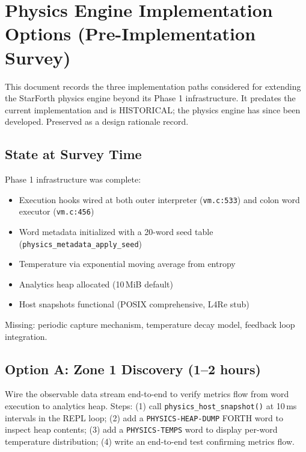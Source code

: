 
\section{Physics Engine Implementation Options (Pre-Implementation Survey)}

This document records the three implementation paths considered for
extending the StarForth physics engine beyond its Phase 1 infrastructure.
It predates the current implementation and is HISTORICAL; the physics engine
has since been developed. Preserved as a design rationale record.

\subsection{State at Survey Time}

Phase 1 infrastructure was complete:

\begin{itemize}
  \item Execution hooks wired at both outer interpreter
        (\texttt{vm.c:533}) and colon word executor (\texttt{vm.c:456})
  \item Word metadata initialized with a 20-word seed table
        (\texttt{physics\_metadata\_apply\_seed})
  \item Temperature via exponential moving average from entropy
  \item Analytics heap allocated (10\,MiB default)
  \item Host snapshots functional (POSIX comprehensive, L4Re stub)
\end{itemize}

Missing: periodic capture mechanism, temperature decay model, feedback loop
integration.

\subsection{Option A: Zone 1 Discovery (1--2 hours)}

Wire the observable data stream end-to-end to verify metrics flow from word
execution to analytics heap. Steps: (1) call \texttt{physics\_host\_snapshot()}
at 10\,ms intervals in the REPL loop; (2) add a \texttt{PHYSICS-HEAP-DUMP}
FORTH word to inspect heap contents; (3) add a \texttt{PHYSICS-TEMPS} word
to display per-word temperature distribution; (4) write an end-to-end test
confirming metrics flow.

